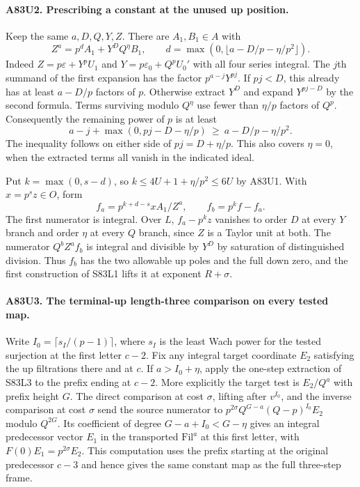 \paragraph{A83U2. Prescribing a constant at the unused up position.}
Keep the same $a,D,Q,Y,Z$. There are $A_1,B_1\in A$ with
\[
 Z^a=p^d A_1+Y^D Q^\eta B_1,\qquad
 d=\max(0,\lfloor a-D/p-\eta/p^2\rfloor).
\]
Indeed $Z=p\varepsilon+Y^pU_1$ and $Y=p\varepsilon_0+Q^p U_0'$
with all four series integral. The $j$th summand of the first
expansion has the factor $p^{a-j}Y^{pj}$. If $pj<D$, this
already has at least $a-D/p$ factors of $p$. Otherwise extract
$Y^D$ and expand $Y^{pj-D}$ by the second formula. Terms
surviving modulo $Q^\eta$ use fewer than $\eta/p$ factors of
$Q^p$. Consequently the remaining power of $p$ is at least
\[
 a-j+\max(0,pj-D-\eta/p)\ \ge\ a-D/p-\eta/p^2 .
\]
The inequality follows on either side of $pj=D+\eta/p$.
This also covers $\eta=0$, when the extracted terms all vanish
in the indicated ideal.

Put $k=\max(0,s-d)$, so $k\le4U+1+\eta/p^2\le6U$ by A83U1.
With $x=p^s z\in O$, form
\[
      f_a=p^{k+d-s}x A_1/Z^a,\qquad f_b=p^kf-f_a .
\]
The first numerator is integral. Over $L$, $f_a-p^k z$ vanishes
to order $D$ at every $Y$ branch and order $\eta$ at every
$Q$ branch, since $Z$ is a Taylor unit at both. The numerator
$Q^bZ^a f_b$ is integral and divisible by $Y^D$ by saturation
of distinguished division. Thus $f_b$ has the two allowable
up poles and the full down zero, and the first construction of
S83L1 lifts it at exponent $R+\sigma$.

\paragraph{A83U3. The terminal-up length-three comparison on every tested map.}
Write $I_0=\lceil s_I/(p-1)\rceil$, where $s_I$ is the least
Wach power for the tested surjection at the first letter $c-2$.
Fix any integral target coordinate $E_2$ satisfying the up
filtrations there and at $c$. If $a>I_0+\eta$, apply the
one-step extraction of S83L3 to the prefix ending at $c-2$.
More explicitly the target test is $E_2/Q^a$ with prefix height
$G$. The direct comparison at cost $\sigma$, lifting after
$v^{I_0}$, and the inverse comparison at cost $\sigma$ send
the source numerator to $p^{2\sigma}Q^{G-a}(Q-p)^{I_0}E_2$
modulo $Q^{2G}$. Its coefficient of degree
$G-a+I_0<G-\eta$ gives an integral predecessor vector $E_1$
in the transported $\mathrm{Fil}^a$ at this first letter, with
$F(0)E_1=p^{2\sigma}E_2$. This computation uses the prefix
starting at the original predecessor $c-3$ and hence gives the
same constant map as the full three-step frame.

